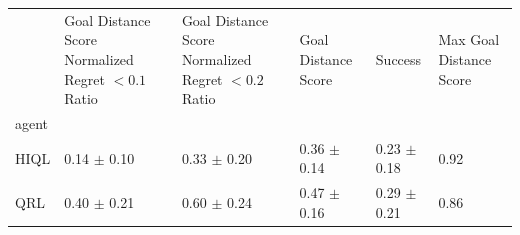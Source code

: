 \begin{tabular}{llllll}
\toprule
 & Goal Distance Score Normalized Regret $< 0.1$ Ratio & Goal Distance Score Normalized Regret $< 0.2$ Ratio & Goal Distance Score & Success & Max Goal Distance Score \\
agent &  &  &  &  &  \\
\midrule
HIQL & 0.14 $\pm$ 0.10 & 0.33 $\pm$ 0.20 & 0.36 $\pm$ 0.14 & 0.23 $\pm$ 0.18 & 0.92 \\
QRL & 0.40 $\pm$ 0.21 & 0.60 $\pm$ 0.24 & 0.47 $\pm$ 0.16 & 0.29 $\pm$ 0.21 & 0.86 \\
\bottomrule
\end{tabular}
